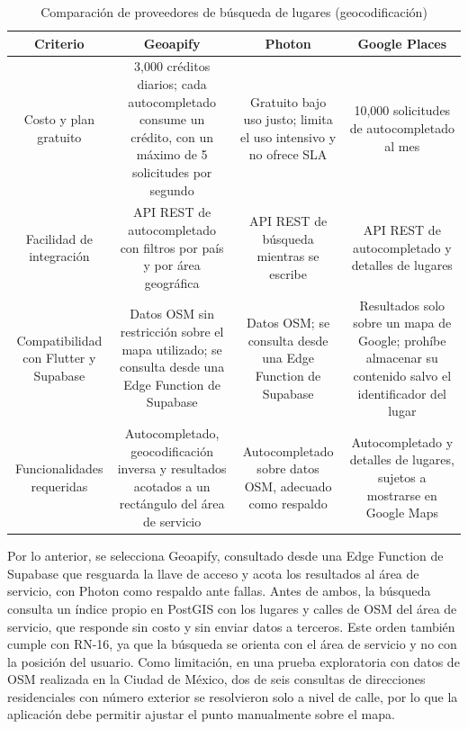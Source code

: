 \begin{table}[htbp]
\centering
\footnotesize
\caption{Comparación de proveedores de búsqueda de lugares (geocodificación)}
\label{tab:comparativa-busqueda}
\begin{tabularx}{\textwidth}{ |C|C|C|C| }
\hline
\textbf{Criterio} & \textbf{Geoapify} & \textbf{Photon} & \textbf{Google Places} \\ \hline

Costo y plan gratuito &
3,000 créditos diarios; cada autocompletado consume un crédito, con un máximo de 5 solicitudes por segundo \cite{geoapify_pricing,geoapify_creditos} &
Gratuito bajo uso justo; limita el uso intensivo y no ofrece SLA \cite{photon} &
10,000 solicitudes de autocompletado al mes \cite{google_maps_pricing} \\ \hline

Facilidad de integración &
API REST de autocompletado con filtros por país y por área geográfica \cite{geoapify_autocomplete} &
API REST de búsqueda mientras se escribe \cite{photon} &
API REST de autocompletado y detalles de lugares \cite{google_maps_pricing} \\ \hline

Compatibilidad con Flutter y Supabase &
Datos OSM sin restricción sobre el mapa utilizado; se consulta desde una Edge Function de Supabase \cite{geoapify_terminos} &
Datos OSM; se consulta desde una Edge Function de Supabase \cite{photon} &
Resultados solo sobre un mapa de Google; prohíbe almacenar su contenido salvo el identificador del lugar \cite{google_places_policies} \\ \hline

Funcionalidades requeridas &
Autocompletado, geocodificación inversa y resultados acotados a un rectángulo del área de servicio \cite{geoapify_autocomplete} &
Autocompletado sobre datos OSM, adecuado como respaldo \cite{photon} &
Autocompletado y detalles de lugares, sujetos a mostrarse en Google Maps \cite{google_places_policies} \\ \hline
\end{tabularx}
\end{table}

Por lo anterior, se selecciona Geoapify, consultado desde una Edge Function de Supabase que resguarda la llave de acceso y acota los resultados al área de servicio, con Photon como respaldo ante fallas. Antes de ambos, la búsqueda consulta un índice propio en PostGIS con los lugares y calles de OSM del área de servicio, que responde sin costo y sin enviar datos a terceros. Este orden también cumple con RN-16, ya que la búsqueda se orienta con el área de servicio y no con la posición del usuario. Como limitación, en una prueba exploratoria con datos de OSM realizada en la Ciudad de México, dos de seis consultas de direcciones residenciales con número exterior se resolvieron solo a nivel de calle, por lo que la aplicación debe permitir ajustar el punto manualmente sobre el mapa.

